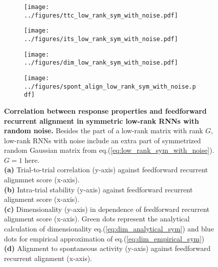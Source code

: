 \documentclass[11pt]{article}
\begin{document}
		\begin{figure}[H]
			\centering
			\begin{subfigure}[b]{0.45\textwidth}
				\centering
				\texttt{[image: ../figures/ttc\_low\_rank\_sym\_with\_noise.pdf]}
				\caption{}
			\end{subfigure}
			\hfill
			\begin{subfigure}[b]{0.45\textwidth}
				\centering
				\texttt{[image: ../figures/its\_low\_rank\_sym\_with\_noise.pdf]}
				\caption{}
			\end{subfigure}
			\newline
			\begin{subfigure}[b]{0.44\textwidth}
				\centering
				\texttt{[image: ../figures/dim\_low\_rank\_sym\_with\_noise.pdf]}
				\caption{}
			\end{subfigure}
			\hfill
			\begin{subfigure}[b]{0.45\textwidth}
				\centering
				\texttt{[image: ../figures/spont\_align\_low\_rank\_sym\_with\_noise.pdf]}
				\caption{}
			\end{subfigure}
		\caption[Correlation between response properties and feedforward recurrent alignment in symmetric low-rank RNNs with random noise]{\textbf{Correlation between response properties and feedforward recurrent alignment in symmetric low-rank RNNs with random noise.} Besides the part of a low-rank matrix with rank $G$, low-rank RNNs with noise include an extra part of symmetrized random Gaussian matrix from eq.(\ref{eq:low_rank_sym_with_noise}). $G=1$ here.\\
		\textbf{(a)} Trial-to-trial correlation (y-axis) against feedforward recurrent alignmnet score (x-axis).\\
		\textbf{(b)} Intra-trial stability (y-axis) against feedforward recurrent alignment score (x-axis). \\
		\textbf{(c)} Dimensionality (y-axis) in dependence of feedforward recurrent alignment score (x-axis). Green dots represent the analytical calculation of dimensionality eq.(\ref{eq:dim_analytical_sym}) and blue dots for empirical approximation of eq.(\ref{eq:dim_empirical_sym})\\
		 \textbf{(d)} Alignment to spontaneous activity (y-axis) against feedforward recurrent alignment (x-axis).}
	 	\label{fig:result_sym_low_rank_with_noise}
		\end{figure}
\end{document}
